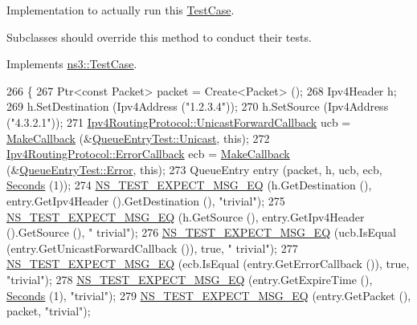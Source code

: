 Implementation to actually run this \hyperlink{classns3_1_1TestCase}{Test\+Case}. 

Subclasses should override this method to conduct their tests. 

Implements \hyperlink{classns3_1_1TestCase_a8ff74680cf017ed42011e4be51917a24}{ns3\+::\+Test\+Case}.


\begin{DoxyCode}
266   \{
267     Ptr<const Packet> packet = Create<Packet> ();
268     Ipv4Header h;
269     h.SetDestination (Ipv4Address (\textcolor{stringliteral}{"1.2.3.4"}));
270     h.SetSource (Ipv4Address (\textcolor{stringliteral}{"4.3.2.1"}));
271     \hyperlink{classns3_1_1Ipv4RoutingProtocol_a3453a85764cbbb1e704da7e919aa5d19}{Ipv4RoutingProtocol::UnicastForwardCallback} ucb = 
      \hyperlink{group__makecallbackmemptr_ga9376283685aa99d204048d6a4b7610a4}{MakeCallback} (&\hyperlink{structns3_1_1aodv_1_1QueueEntryTest_aa3f211d715837814ab8e3692bc5cadf2}{QueueEntryTest::Unicast}, \textcolor{keyword}{this});
272     \hyperlink{classns3_1_1Ipv4RoutingProtocol_a0348285418c30d5021b08f7a68af21ea}{Ipv4RoutingProtocol::ErrorCallback} ecb = 
      \hyperlink{group__makecallbackmemptr_ga9376283685aa99d204048d6a4b7610a4}{MakeCallback} (&\hyperlink{structns3_1_1aodv_1_1QueueEntryTest_a9aff7c2983d235c565c722fd3dcc24ff}{QueueEntryTest::Error}, \textcolor{keyword}{this});
273     QueueEntry entry (packet, h, ucb, ecb, \hyperlink{group__timecivil_ga33c34b816f8ff6628e33d5c8e9713b9e}{Seconds} (1));
274     \hyperlink{group__testing_ga7304ba46a28d8cf08dfdfd6499cf7068}{NS\_TEST\_EXPECT\_MSG\_EQ} (h.GetDestination (),  entry.GetIpv4Header ().GetDestination
       (), \textcolor{stringliteral}{"trivial"});
275     \hyperlink{group__testing_ga7304ba46a28d8cf08dfdfd6499cf7068}{NS\_TEST\_EXPECT\_MSG\_EQ} (h.GetSource (),  entry.GetIpv4Header ().GetSource (), \textcolor{stringliteral}{"
      trivial"});
276     \hyperlink{group__testing_ga7304ba46a28d8cf08dfdfd6499cf7068}{NS\_TEST\_EXPECT\_MSG\_EQ} (ucb.IsEqual (entry.GetUnicastForwardCallback ()), \textcolor{keyword}{true}, \textcolor{stringliteral}{"
      trivial"});
277     \hyperlink{group__testing_ga7304ba46a28d8cf08dfdfd6499cf7068}{NS\_TEST\_EXPECT\_MSG\_EQ} (ecb.IsEqual (entry.GetErrorCallback ()), \textcolor{keyword}{true}, \textcolor{stringliteral}{"trivial"});
278     \hyperlink{group__testing_ga7304ba46a28d8cf08dfdfd6499cf7068}{NS\_TEST\_EXPECT\_MSG\_EQ} (entry.GetExpireTime (), \hyperlink{group__timecivil_ga33c34b816f8ff6628e33d5c8e9713b9e}{Seconds} (1), \textcolor{stringliteral}{"trivial"});
279     \hyperlink{group__testing_ga7304ba46a28d8cf08dfdfd6499cf7068}{NS\_TEST\_EXPECT\_MSG\_EQ} (entry.GetPacket (), packet, \textcolor{stringliteral}{"trivial"});

\end{DoxyCode}
